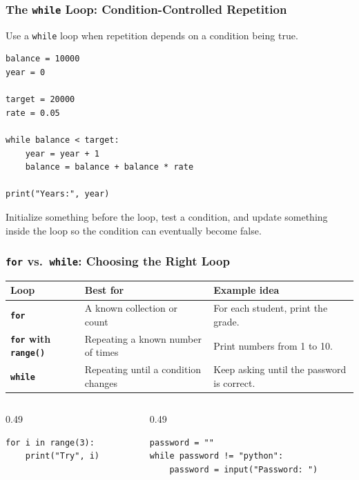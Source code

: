 \documentclass[aspectratio=169,10pt]{beamer}
\begin{document}
\begin{frame}[fragile]
\frametitle{The \texttt{while} Loop: Condition-Controlled Repetition}
Use a \texttt{while} loop when repetition depends on a condition being true.

\begin{lstlisting}[style=pycode]
balance = 10000
year = 0

target = 20000
rate = 0.05

while balance < target:
    year = year + 1
    balance = balance + balance * rate

print("Years:", year)
\end{lstlisting}

\begin{tcolorbox}[lecturebox,title=Loop checklist]
Initialize something before the loop, test a condition, and update something inside the loop so the condition can eventually become false.
\end{tcolorbox}
\end{frame}


\begin{frame}[fragile]
\frametitle{\texttt{for} vs.\ \texttt{while}: Choosing the Right Loop}
\begin{center}
\small
\begin{tabularx}{0.95\textwidth}{>{\bfseries}p{2.5cm}X X}
\toprule
Loop & Best for & Example idea \\
\midrule
\texttt{for} & A known collection or count & For each student, print the grade. \\
\texttt{for} with \texttt{range()} & Repeating a known number of times & Print numbers from 1 to 10. \\
\texttt{while} & Repeating until a condition changes & Keep asking until the password is correct. \\
\bottomrule
\end{tabularx}
\end{center}

\begin{columns}[T,totalwidth=\textwidth]
\begin{column}{0.49\textwidth}
\begin{lstlisting}[style=pycodesmall]
for i in range(3):
    print("Try", i)
\end{lstlisting}
\end{column}
\begin{column}{0.49\textwidth}
\begin{lstlisting}[style=pycodesmall]
password = ""
while password != "python":
    password = input("Password: ")
\end{lstlisting}
\end{column}
\end{columns}
\end{frame}
\end{document}

